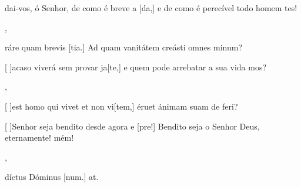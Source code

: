 {        {\item {}dai-vos, ó Senhor, de como é breve a [da,] e de como é perecível todo homem \-tes!},
    {\item {}ráre quam brevis [tia.] Ad quam vanitátem creásti omnes minum?}%
        {\item {}[ ]{a}caso viverá sem provar ja[te,] e quem pode arrebatar a sua vida mos?},
    {\item {}[ ]{est} homo qui vivet et non vi[tem,] éruet ánimam suam de feri?}%
        {\item {}[ ]{Se}nhor seja bendito desde agora e [pre!] Bendito seja o Senhor Deus, eternamente! mém!},
    {\item {}díctus Dóminus [num.] at.}%
        {}
}
